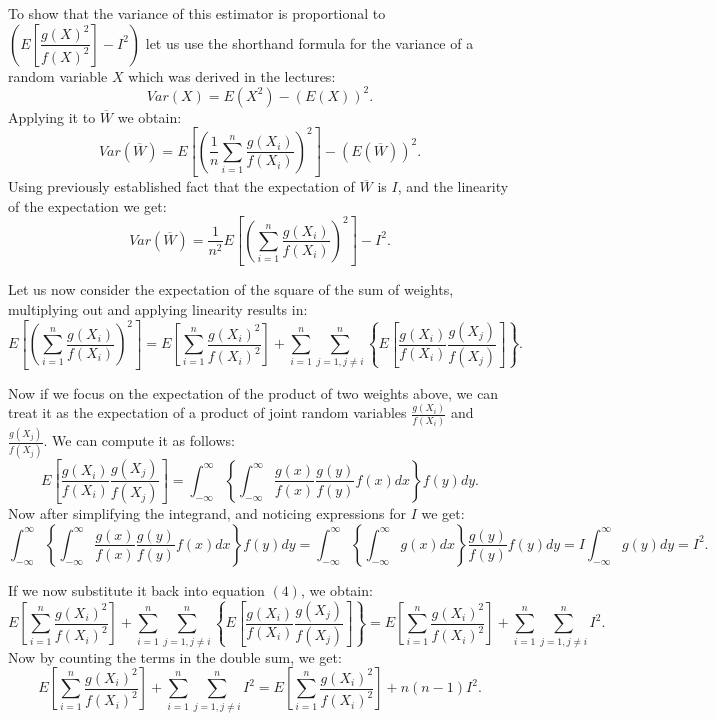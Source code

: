 \documentclass[12pt]{article}
\newcommand\lb{\left\lbrace}
\newcommand\rb{\right\rbrace}
\begin{document}
To show that the variance of this estimator is proportional to $ \left( E\left[\dfrac{g(X)^2}{f(X)^2}\right] - I^2\right)$
let us use the shorthand formula for the variance of a random variable $ X $ which was derived in the lectures:
\[ Var (X) = E (X^2) - (E(X))^2.\]
Applying it to $ \overline{W} $ we obtain:
\[ Var (\overline{W}) = E \left[\left(\frac{1}{n}\sum_{i = 1}^n \frac{g(X_i)}{f(X_i)}\right)^2\right] - (E(\overline{W}))^2. \]
Using previously established fact that the expectation of $ \overline{W} $ is $ I $, and the linearity of 
the expectation we get:
\begin{equation} 
Var (\overline{W}) = \frac{1}{n^2} E \left[\left(\sum_{i = 1}^n \frac{g(X_i)}{f(X_i)}\right)^2\right] - I^2.
\end{equation}

Let us now consider the expectation of the square of the sum of weights, 
multiplying out and applying linearity results in:
\begin{equation}
E \left[\left(\sum_{i=1}^n \frac{g(X_i)}{f(X_i)}\right)^2\right] 
= E \left[\sum_{i = 1}^n \frac{g(X_i)^2}{f(X_i)^2} \right] + \sum_{i=1}^n \sum_{j=1, j \neq i}^n \lb E \left[ \frac{g(X_i)}{f(X_i)} \frac{g(X_j)}{f(X_j)} \right] \rb.
\end{equation}

Now if we focus on the expectation of the product of two weights above, we can treat it as the 
expectation of a product of joint random variables $ \frac{g(X_i)}{f(X_i)} $ and $ \frac{g(X_j)}{f(X_j)}$. We can compute it as follows: 
\[ E \left[ \frac{g(X_i)}{f(X_i)} \frac{g(X_j)}{f(X_j)} \right] 
= \int_{-\infty}^\infty \lb \int_{-\infty}^\infty \frac{g(x)}{f(x)} \frac{g(y)}{f(y)} f(x) dx\rb f(y) dy. \]
Now after simplifying the integrand, and noticing expressions for $ I $ we get: 
\[ \int_{-\infty}^\infty \lb \int_{-\infty}^\infty \frac{g(x)}{f(x)} \frac{g(y)}{f(y)} f(x) dx\rb f(y)dy 
= \int_{-\infty}^\infty \lb \int_{-\infty}^\infty g(x)dx\rb \frac{g(y)}{f(y)} f(y)dy
= I\int_{-\infty}^\infty g(y) dy = I^2. \]

If we now substitute it back into equation $(4)$, we obtain:
\begin{equation} 
E \left[\sum_{i = 1}^n \frac{g(X_i)^2}{f(X_i)^2} \right] + \sum_{i=1}^n \sum_{j=1, j \neq i}^n \lb E \left[ \frac{g(X_i)}{f(X_i)} \frac{g(X_j)}{f(X_j)} \right] \rb 
= E \left[\sum_{i = 1}^n \frac{g(X_i)^2}{f(X_i)^2} \right] + \sum_{i=1}^n \sum_{j=1, j \neq i}^n I^2.
\end{equation}
Now by counting the terms in the double sum, we get:
\[
E \left[\sum_{i = 1}^n \frac{g(X_i)^2}{f(X_i)^2} \right] + \sum_{i=1}^n \sum_{j=1, j \neq i}^n I^2 
= E \left[\sum_{i = 1}^n \frac{g(X_i)^2}{f(X_i)^2} \right] + n (n - 1) I^2. 
\]
\end{document}
